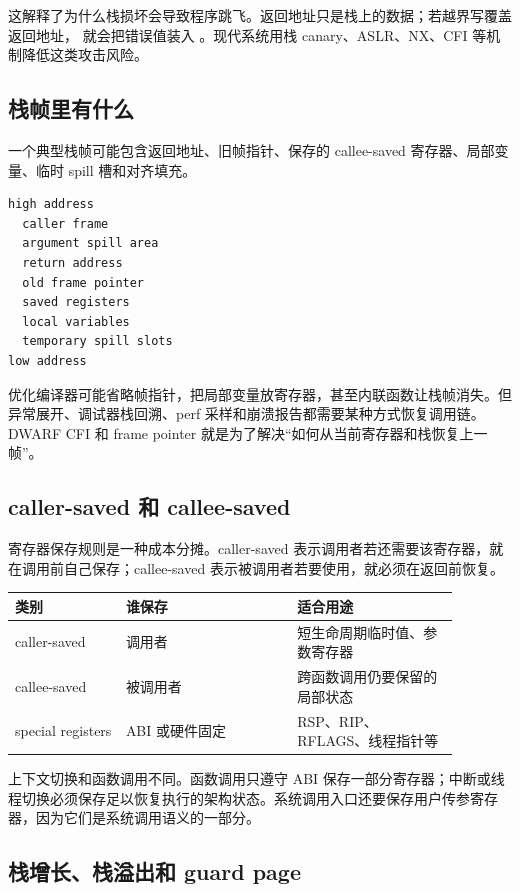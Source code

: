 这解释了为什么栈损坏会导致程序跳飞。返回地址只是栈上的数据；若越界写覆盖返回地址， 就会把错误值装入 。现代系统用栈 canary、ASLR、NX、CFI 等机制降低这类攻击风险。

\subsection{栈帧里有什么}

一个典型栈帧可能包含返回地址、旧帧指针、保存的 callee-saved 寄存器、局部变量、临时 spill 槽和对齐填充。

\begin{lstlisting}
high address
  caller frame
  argument spill area
  return address
  old frame pointer
  saved registers
  local variables
  temporary spill slots
low address
\end{lstlisting}

优化编译器可能省略帧指针，把局部变量放寄存器，甚至内联函数让栈帧消失。但异常展开、调试器栈回溯、perf 采样和崩溃报告都需要某种方式恢复调用链。DWARF CFI 和 frame pointer 就是为了解决“如何从当前寄存器和栈恢复上一帧”。

\subsection{caller-saved 和 callee-saved}

寄存器保存规则是一种成本分摊。caller-saved 表示调用者若还需要该寄存器，就在调用前自己保存；callee-saved 表示被调用者若要使用，就必须在返回前恢复。

\begin{longtable}{p{0.22\linewidth}p{0.34\linewidth}p{0.32\linewidth}}
\toprule
类别 & 谁保存 & 适合用途 \\
\midrule
caller-saved & 调用者 & 短生命周期临时值、参数寄存器 \\
callee-saved & 被调用者 & 跨函数调用仍要保留的局部状态 \\
special registers & ABI 或硬件固定 & RSP、RIP、RFLAGS、线程指针等 \\
\bottomrule
\end{longtable}

上下文切换和函数调用不同。函数调用只遵守 ABI 保存一部分寄存器；中断或线程切换必须保存足以恢复执行的架构状态。系统调用入口还要保存用户传参寄存器，因为它们是系统调用语义的一部分。

\subsection{栈增长、栈溢出和 guard page}

